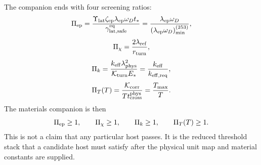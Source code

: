 The companion ends with four screening ratios:
\begin{equation}
\label{eq:app-part08-stage253-pi-ep}
\Pi_{\rm ep}
=
\frac{\Upsilon_{\rm lat}\zeta_{\rm ep}\lambda_{\rm ep}\omega_Dt_*}{\gamma_{\rm lat,safe}^{\rm eq}}
=
\frac{\lambda_{\rm ep}\omega_D}{(\lambda_{\rm ep}\omega_D)_{\min}^{(253)}},
\end{equation}
\begin{equation}
\label{eq:app-part08-stage253-pi-chi}
\Pi_\chi=\frac{2\lambda_{\rm ref}}{r_{\rm turn}},
\end{equation}
\begin{equation}
\label{eq:app-part08-stage253-pi-k}
\Pi_k=
\frac{k_{\rm eff}\lambda_{\rm phys}^{2}}{\mathcal K_{\rm turn}E_*}
=
\frac{k_{\rm eff}}{k_{\rm eff,req}},
\end{equation}
\begin{equation}
\label{eq:app-part08-stage253-pi-t}
\Pi_T(T)=
\frac{\mathcal K_{\rm corr}}{Tt_{\rm cross}^{\rm phys}}
=
\frac{T_{\max}}{T}.
\end{equation}
The materials companion is then
\begin{equation}
\label{eq:app-part08-stage253-final-screen}
\Pi_{\rm ep}\ge1,
\qquad
\Pi_\chi\ge1,
\qquad
\Pi_k\ge1,
\qquad
\Pi_T(T)\ge1.
\end{equation}
This is not a claim that any particular host passes.  It is the reduced threshold stack that a candidate host must satisfy after the physical unit map and material constants are supplied.
